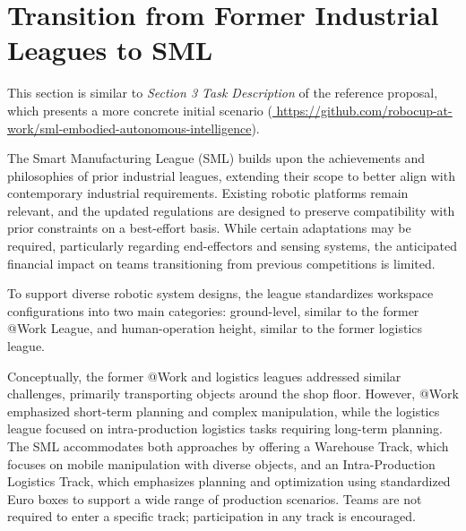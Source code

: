 \documentclass[letterpaper, 11pt]{extarticle}
\begin{document}



\section{Transition from Former Industrial Leagues to SML}
\label{sec:transition}
\begin{tcolorbox}[disclaimerbox, title=Disclaimer]
This section is similar to \emph{Section 3 Task Description} of the reference proposal, which presents a more concrete initial scenario (\url{ https://github.com/robocup-at-work/sml-embodied-autonomous-intelligence}).
\end{tcolorbox}


The Smart Manufacturing League (SML) builds upon the achievements and philosophies of prior industrial leagues, extending their scope to better align with contemporary industrial requirements. Existing robotic platforms remain relevant, and the updated regulations are designed to preserve compatibility with prior constraints on a best-effort basis. While certain adaptations may be required, particularly regarding end-effectors and sensing systems, the anticipated financial impact on teams transitioning from previous competitions is limited.

To support diverse robotic system designs, the league standardizes workspace configurations into two main categories: ground-level, similar to the former @Work League, and human-operation height, similar to the former logistics league.

Conceptually, the former @Work and logistics leagues addressed similar challenges, primarily transporting objects around the shop floor. However, @Work emphasized short-term planning and complex manipulation, while the logistics league focused on intra-production logistics tasks requiring long-term planning. The SML accommodates both approaches by offering a Warehouse Track, which focuses on mobile manipulation with diverse objects, and an Intra-Production Logistics Track, which emphasizes planning and optimization using standardized Euro boxes to support a wide range of production scenarios. Teams are not required to enter a specific track; participation in any track is encouraged.
\end{document}

